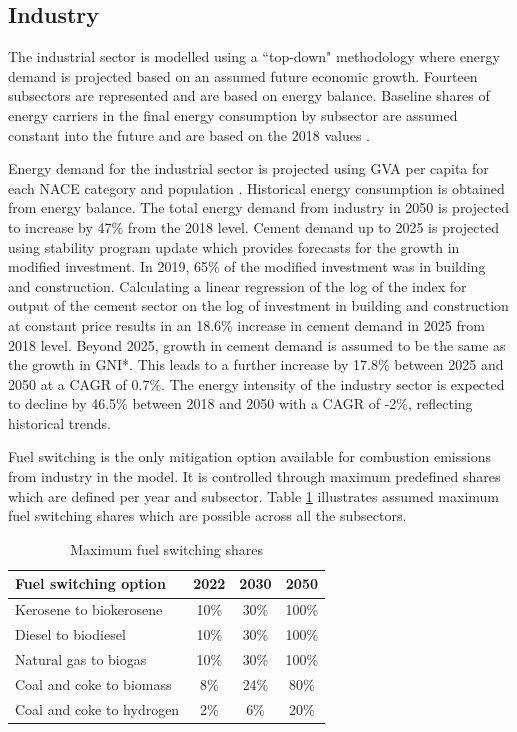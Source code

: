\documentclass[gmd,manuscript]{copernicus}
\begin{document}
\subsection{Industry}
\label{ss:industry}
The industrial sector is modelled using a ``top-down" methodology where energy demand is projected based on an assumed future economic growth. Fourteen subsectors are represented and are based on \citet{SEAI2019} energy balance. Baseline shares of energy carriers in the final energy consumption by subsector are assumed constant into the future and are based on the 2018 values \citep{SEAI2019}. 

Energy demand for the industrial sector is projected using GVA per capita for each NACE category and population \citep{Yakut2020}. Historical energy consumption is obtained from \citet{SEAI2019} energy balance. The total energy demand from industry in 2050 is projected to increase by 47\% from the 2018 level. Cement demand up to 2025 is projected using \cite{April2020} stability program update which provides forecasts for the growth in modified investment. In 2019, 65\% of the modified investment was in building and construction. Calculating a linear regression of the log of the index for output of the cement sector on the log of investment in building and construction at constant price results in an 18.6\% increase in cement demand in 2025 from 2018 level. Beyond 2025, growth in cement demand is assumed to be the same as the growth in GNI*. This leads to a further increase by 17.8\% between 2025 and 2050 at a CAGR of 0.7\%. The energy intensity of the industry sector is expected to decline by 46.5\% between 2018 and 2050 with a CAGR of -2\%, reflecting historical trends. 

Fuel switching is the only mitigation option available for combustion emissions from industry in the model. It is controlled through maximum predefined shares which are defined per year and subsector. Table \ref{Maximum fuel switching share in Industry} illustrates assumed maximum fuel switching shares which are possible across all the subsectors. 

\begin{table}[htbp]
\footnotesize
 \centering
 \caption{Maximum fuel switching shares}
 \begin{tabular}{lccc}
 \hline
 Fuel switching option & 2022 & 2030 & 2050 \\
 \hline
 Kerosene to biokerosene & 10\% & 30\% & 100\% \\
 Diesel to biodiesel & 10\% & 30\% & 100\% \\
 Natural gas to biogas & 10\% & 30\% & 100\% \\ 
 Coal and coke to biomass & 8\% & 24\% & 80\% \\ 
 Coal and coke to hydrogen & 2\% & 6\% & 20\% \\ \hline
 \end{tabular}%
 \label{Maximum fuel switching share in Industry}%
\end{table}%
\end{document}
